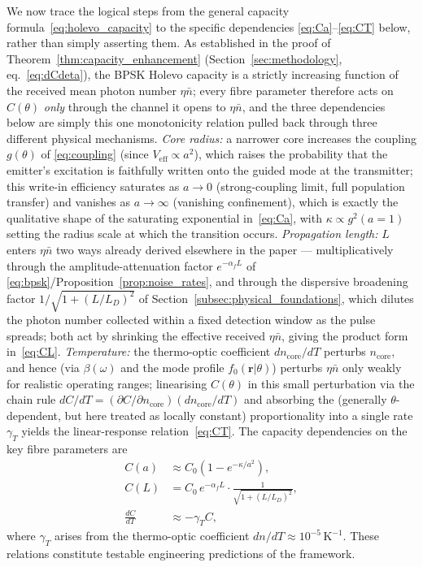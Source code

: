 \documentclass[journal,twocolumn]{IEEEtran}
\theoremstyle{definition}
\theoremstyle{plain}
\newcommand{\alphaf}{\alpha_{f}}
\begin{document}
We now trace the logical steps from the general capacity
formula~\eqref{eq:holevo_capacity} to the specific dependencies
\eqref{eq:Ca}--\eqref{eq:CT} below, rather than simply asserting
them.  As established in the proof of
Theorem~\ref{thm:capacity_enhancement} (Section~\ref{sec:methodology},
eq.~\eqref{eq:dCdeta}), the BPSK Holevo capacity is a strictly
increasing function of the received mean photon number $\eta\bar
n$; every fibre parameter therefore acts on $C(\theta)$ \emph{only}
through the channel it opens to $\eta\bar n$, and the three
dependencies below are simply this one monotonicity relation pulled
back through three different physical mechanisms.
\emph{Core radius:} a narrower core increases the coupling
$g(\theta)$ of \eqref{eq:coupling} (since $V_{\mathrm{eff}} \propto
a^2$), which raises the probability that the emitter's excitation is
faithfully written onto the guided mode at the transmitter; this
write-in efficiency saturates as $a\to 0$ (strong-coupling limit,
full population transfer) and vanishes as $a\to\infty$ (vanishing
confinement), which is exactly the qualitative shape of the
saturating exponential in~\eqref{eq:Ca}, with $\kappa \propto
g^2(a{=}1)$ setting the radius scale at which the transition occurs.
\emph{Propagation length:} $L$ enters $\eta\bar n$ two ways already
derived elsewhere in the paper --- multiplicatively through the
amplitude-attenuation factor $e^{-\alphaf L}$ of
\eqref{eq:bpsk}/Proposition~\ref{prop:noise_rates}, and through the
dispersive broadening factor $1/\sqrt{1+(L/L_D)^2}$ of
Section~\ref{subsec:physical_foundations}, which dilutes the
photon number collected within a fixed detection window as the
pulse spreads; both act by shrinking the effective received
$\eta\bar n$, giving the product form in~\eqref{eq:CL}.
\emph{Temperature:} the thermo-optic coefficient $dn_{\mathrm{core}}/dT$
perturbs $n_{\mathrm{core}}$, and hence (via $\beta(\omega)$ and the
mode profile $f_0(\mathbf r|\theta)$) perturbs $\eta\bar n$ only
weakly for realistic operating ranges; linearising $C(\theta)$ in
this small perturbation via the chain rule $dC/dT =
(\partial C/\partial n_{\mathrm{core}})(dn_{\mathrm{core}}/dT)$ and
absorbing the (generally $\theta$-dependent, but here treated as
locally constant) proportionality into a single rate $\gamma_T$
yields the linear-response relation~\eqref{eq:CT}. The capacity
dependencies on the key fibre parameters are
\begin{align}
  C(a) &\approx C_0\!\left(1 - e^{-\kappa/a^2}\right), \label{eq:Ca}\\
  C(L) &= C_0\, e^{-\alphaf L} \cdot
    \frac{1}{\sqrt{1+(L/L_D)^2}}, \label{eq:CL}\\
  \frac{dC}{dT} &\approx -\gamma_T C, \label{eq:CT}
\end{align}
where $\gamma_T$ arises from the thermo-optic coefficient
$dn/dT \approx 10^{-5}\,\mathrm{K}^{-1}$.  These relations
constitute testable engineering predictions of the framework.
\end{document}
